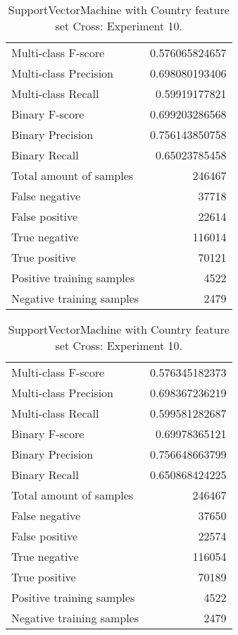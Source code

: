 \begin{table}[H]
\begin{minipage}{0.5\textwidth}
\caption{SupportVectorMachine with Country feature set Cross: Experiment 9.}
\centering
\begin{tabular}{l r}
\toprule
Multi-class F-score & 0.576065824657 \\
Multi-class Precision & 0.698080193406 \\
Multi-class Recall & 0.59919177821 \\
\midrule
Binary F-score & 0.699203286568 \\
Binary Precision & 0.756143850758 \\
Binary Recall & 0.65023785458 \\
\midrule
Total amount of samples & 246467 \\
False negative & 37718 \\
False positive & 22614 \\
True negative & 116014 \\
True positive & 70121 \\
\midrule
Positive training samples & 4522 \\
Negative training samples & 2479 \\
\bottomrule
\end{tabular}
\end{minipage}
\hfillx
\begin{minipage}{0.5\textwidth}
\caption{SupportVectorMachine with Country feature set Cross: Experiment 10.}
\centering
\begin{tabular}{l r}
\toprule
Multi-class F-score & 0.576345182373 \\
Multi-class Precision & 0.698367236219 \\
Multi-class Recall & 0.599581282687 \\
\midrule
Binary F-score & 0.69978365121 \\
Binary Precision & 0.756648663799 \\
Binary Recall & 0.650868424225 \\
\midrule
Total amount of samples & 246467 \\
False negative & 37650 \\
False positive & 22574 \\
True negative & 116054 \\
True positive & 70189 \\
\midrule
Positive training samples & 4522 \\
Negative training samples & 2479 \\
\bottomrule
\end{tabular}
\end{minipage}
\end{table}
